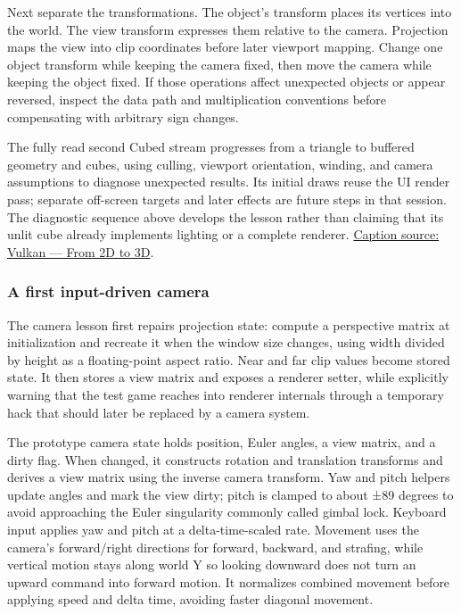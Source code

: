 Next separate the transformations. The object's transform places its vertices into the world. The view transform expresses them relative to the camera. Projection maps the view into clip coordinates before later viewport mapping. Change one object transform while keeping the camera fixed, then move the camera while keeping the object fixed. If those operations affect unexpected objects or appear reversed, inspect the data path and multiplication conventions before compensating with arbitrary sign changes.

The fully read second Cubed stream progresses from a triangle to buffered geometry and cubes, using culling, viewport orientation, winding, and camera assumptions to diagnose unexpected results. Its initial draws reuse the UI render pass; separate off-screen targets and later effects are future steps in that session. The diagnostic sequence above develops the lesson rather than claiming that its unlit cube already implements lighting or a complete renderer. \href{https://www.youtube.com/watch?v=hSL9dCjwoCU}{Caption source: Vulkan --- From 2D to 3D}.

\subsubsection{A first input-driven camera}\label{06-engine-ii-ch026-a-first-input-driven-camera}

\hypertarget{06-engine-ii-ch026-a-first-input-driven-camera}{}

The camera lesson first repairs projection state: compute a perspective matrix at initialization and recreate it when the window size changes, using width divided by height as a floating-point aspect ratio. Near and far clip values become stored state. It then stores a view matrix and exposes a renderer setter, while explicitly warning that the test game reaches into renderer internals through a temporary hack that should later be replaced by a camera system.

The prototype camera state holds position, Euler angles, a view matrix, and a dirty flag. When changed, it constructs rotation and translation transforms and derives a view matrix using the inverse camera transform. Yaw and pitch helpers update angles and mark the view dirty; pitch is clamped to about ±89 degrees to avoid approaching the Euler singularity commonly called gimbal lock. Keyboard input applies yaw and pitch at a delta-time-scaled rate. Movement uses the camera's forward/right directions for forward, backward, and strafing, while vertical motion stays along world Y so looking downward does not turn an upward command into forward motion. It normalizes combined movement before applying speed and delta time, avoiding faster diagonal movement.


